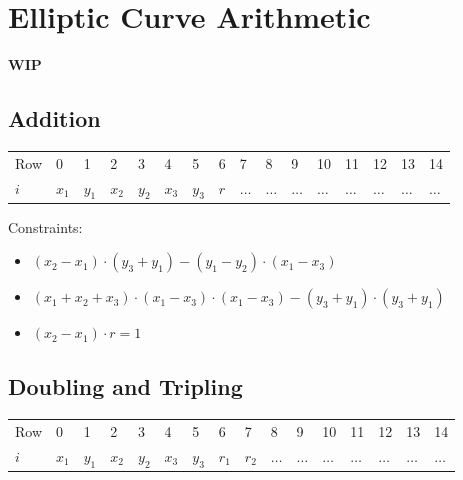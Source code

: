 \section{Elliptic Curve Arithmetic}
\label{section:ec}
\textbf{WIP}

\subsection{Addition}

\begin{center}
    \begin{table}[H]
        \begin{tabular}{llllllllllllllll}
            Row   & 0     & 1     & 2     & 3     & 4     & 5     & 6   & 7       & 8       & 9       & 10      & 11      & 12      & 13      & 14      \\
            $i$ & $x_1$ & $y_1$ & $x_2$ & $y_2$ & $x_3$ & $y_3$ & $r$ & $\dots$ & $\dots$ & $\dots$ & $\dots$ & $\dots$ & $\dots$ & $\dots$ & $\dots$ \\
        \end{tabular}
    \end{table}
\end{center}

Constraints:
\begin{itemize}
    \item $(x_2 - x_1) \cdot (y_3 + y_1) - (y_1 - y_2) \cdot (x_1 - x_3)$
    \item $(x_1 + x_2 + x_3) \cdot (x_1 - x_3) \cdot (x_1 - x_3) - (y_3 + y_1) \cdot (y_3 + y_1)$
    \item $(x_2 - x_1) \cdot r = 1$
\end{itemize}

\subsection{Doubling and Tripling}

\begin{center}
    \begin{table}[H]
        \begin{tabular}{llllllllllllllll}
            Row   & 0     & 1     & 2     & 3     & 4     & 5     & 6     & 7     & 8       & 9       & 10      & 11      & 12      & 13      & 14      \\
            $i$ & $x_1$ & $y_1$ & $x_2$ & $y_2$ & $x_3$ & $y_3$ & $r_1$ & $r_2$ & $\dots$ & $\dots$ & $\dots$ & $\dots$ & $\dots$ & $\dots$ & $\dots$ \\
        \end{tabular}
    \end{table}
\end{center}

